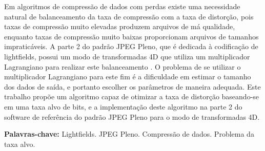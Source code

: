 \begin{resumo}[Resumo]
    Em algoritmos de compressão de dados com perdas existe uma necessidade natural de balanceamento da taxa de compressão com a taxa de distorção,
    pois taxas de compressão muito elevadas produzem arquivos de má qualidade, enquanto taxas de compressão muito baixas proporcionam arquivos de
    tamanhos impraticáveis.
    A parte 2 do padrão JPEG Pleno, que é dedicada à codificação de lightfields, possui um modo de transformadas 4D que utiliza um multiplicador
    Lagrangiano para realizar este balanceamento \cite{4d_codec}. O problema de se utilizar o multiplicador Lagrangiano para este fim é a dificuldade
    em estimar o tamanho dos dados de saída, e portanto escolher os parâmetros de maneira adequada. Este trabalho propõe um algoritmo capaz de 
    otimizar a taxa de distorção baseando-se em uma taxa alvo de bits, e a implementação deste algoritmo na parte 2 do software de 
    referência do padrão JPEG Pleno para o modo de transformadas 4D.


    \vspace{\baselineskip} 
    \textbf{Palavras-chave:} Lightfields. JPEG Pleno. Compressão de dados. Problema da taxa alvo.
\end{resumo}
